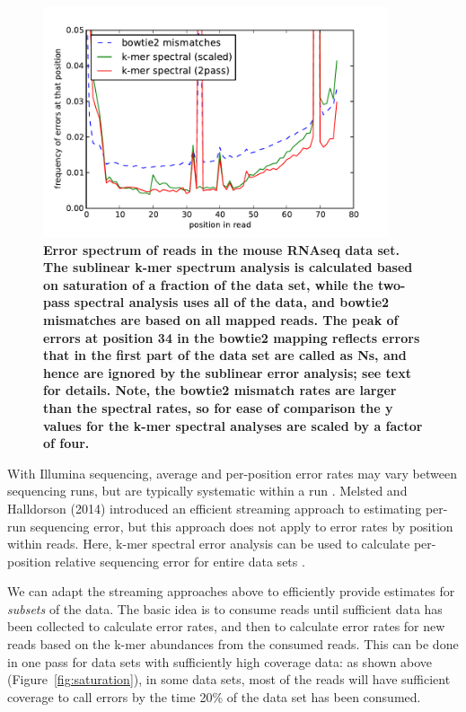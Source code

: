 \documentclass{article}
\begin{document}
\begin{figure}[!ht]
 \centerline{\includegraphics[width=4in]{./figures/rseq-errhist}}
\caption{{\bf Error spectrum of reads in the mouse RNAseq data set.
    The sublinear k-mer spectrum analysis is calculated based on
    saturation of a fraction of the data set, while the two-pass
    spectral analysis uses all of the data, and bowtie2 mismatches are
    based on all mapped reads.  The peak of errors at position 34 in
    the bowtie2 mapping reflects errors that in the first part of the
    data set are called as Ns, and hence are ignored by the sublinear
    error analysis; see text for details. Note, the bowtie2 mismatch
    rates are larger than the spectral rates, so for ease of
    comparison the y values for the k-mer spectral analyses are scaled
    by a factor of four.}}
\label{fig:rseq_err}
\end{figure}

With Illumina sequencing, average and per-position error rates may
vary between sequencing runs, but are typically systematic within a
run \cite{drisee,XXX}.  Melsted and Halldorson (2014) introduced an
efficient streaming approach to estimating per-run sequencing error,
but this approach does not apply to error rates by position within
reads.  Here, k-mer spectral error analysis can be used to calculate
per-position relative sequencing error for entire data sets
\cite{Zhang2014}.

We can adapt the streaming approaches above to efficiently provide
estimates for {\em subsets} of the data.  The basic idea is to consume
reads until sufficient data has been collected to calculate error
rates, and then to calculate error rates for new reads based on the
k-mer abundances from the consumed reads.  This can be done in one
pass for data sets with sufficiently high coverage data: as shown
above (Figure~\ref{fig:saturation}), in some data sets, most of the
reads will have sufficient coverage to call errors by the time 20\% of
the data set has been consumed.
\end{document}
